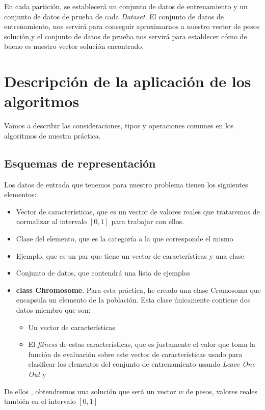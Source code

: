 \documentclass[11pt]{article}
\begin{document}
En cada partición, se establecerá un conjunto de datos de entrenamiento y un conjunto de datos de prueba de cada \emph{Dataset}. El conjunto de datos de entrenamiento, nos servirá para conseguir aproximarnos a nuestro vector de pesos solución,y el conjunto de datos de prueba nos servirá para establecer cómo de bueno es nuestro vector solución encontrado.



\section{Descripción de la aplicación de los algoritmos}
Vamos a describir las consideraciones, tipos y operaciones comunes en los algoritmos de nuestra práctica.

\subsection{Esquemas de representación}
Los datos de entrada que tenemos para nuestro problema tienen los siguientes elementos:
\begin{itemize}
	\item Vector de características, que es un vector de valores reales que trataremos de normalizar al intervalo $[0,1]$ para trabajar con ellos.
	\item Clase del elemento, que es la categoría a la que corresponde el mismo
	\item Ejemplo, que es un par que tiene un vector de características y una clase
	\item Conjunto de datos, que contendrá una lista de ejemplos
	
	\item \textbf{class Chromosome}. Para esta práctica, he creado una clase Cromosoma que encapsula un elemento de la población. Esta clase únicamente contiene dos datos miembro que son:
\begin{itemize}
	\item Un vector de características
	\item El \emph{fitness} de estas características, que es justamente el valor que toma la función de evaluación sobre este vector de características usado para clasificar los elementos del conjunto de entrenamiento usando \emph{Leave One Out} y 
\end{itemize}

\end{itemize}
De ellos , obtendremos una solución que será un vector $w$ de pesos, valores reales también en el intervalo $[0,1]$
\end{document}
